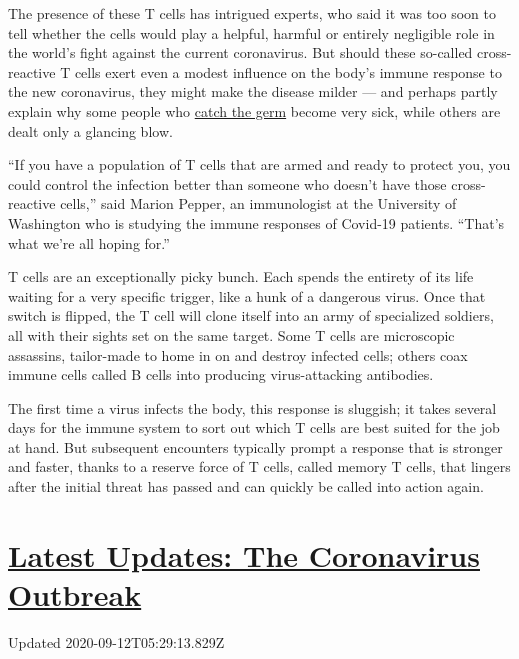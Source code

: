 The presence of these T cells has intrigued experts, who said it was too
soon to tell whether the cells would play a helpful, harmful or entirely
negligible role in the world's fight against the current coronavirus.
But should these so-called cross-reactive T cells exert even a modest
influence on the body's immune response to the new coronavirus, they
might make the disease milder --- and perhaps partly explain why some
people who
\href{https://www.nytimes3xbfgragh.onion/2020/08/04/health/coronavirus-immune-system.html}{catch
the germ} become very sick, while others are dealt only a glancing blow.

``If you have a population of T cells that are armed and ready to
protect you, you could control the infection better than someone who
doesn't have those cross-reactive cells,'' said Marion Pepper, an
immunologist at the University of Washington who is studying the immune
responses of Covid-19 patients. ``That's what we're all hoping for.''

T cells are an exceptionally picky bunch. Each spends the entirety of
its life waiting for a very specific trigger, like a hunk of a dangerous
virus. Once that switch is flipped, the T cell will clone itself into an
army of specialized soldiers, all with their sights set on the same
target. Some T cells are microscopic assassins, tailor-made to home in
on and destroy infected cells; others coax immune cells called B cells
into producing virus-attacking antibodies.

The first time a virus infects the body, this response is sluggish; it
takes several days for the immune system to sort out which T cells are
best suited for the job at hand. But subsequent encounters typically
prompt a response that is stronger and faster, thanks to a reserve force
of T cells, called memory T cells, that lingers after the initial threat
has passed and can quickly be called into action again.

\hypertarget{latest-updates-the-coronavirus-outbreak}{%
\section{\texorpdfstring{\href{https://www.nytimes3xbfgragh.onion/2020/09/11/world/covid-19-coronavirus.html?action=click\&pgtype=Article\&state=default\&region=MAIN_CONTENT_1\&context=storylines_live_updates}{Latest
Updates: The Coronavirus
Outbreak}}{Latest Updates: The Coronavirus Outbreak}}\label{latest-updates-the-coronavirus-outbreak}}

Updated 2020-09-12T05:29:13.829Z

